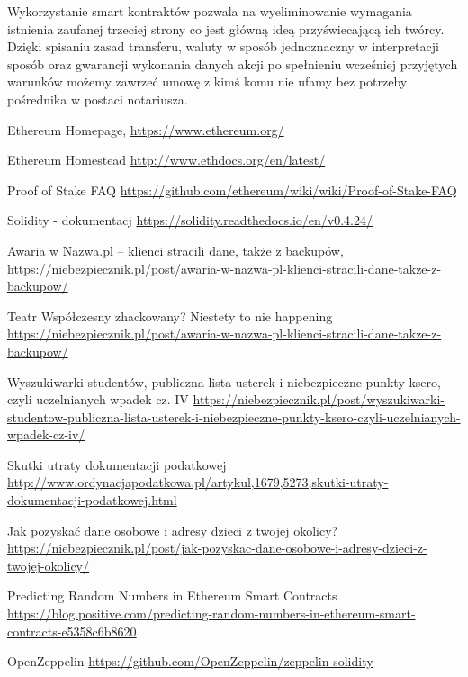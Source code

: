 \documentclass[]{llncs}
\begin{document}
  Wykorzystanie smart kontraktów pozwala na wyeliminowanie wymagania istnienia
  zaufanej trzeciej strony co jest główną ideą przyświecającą ich twórcy. Dzięki
  spisaniu zasad transferu, waluty w sposób jednoznaczny w interpretacji sposób
  oraz gwarancji wykonania danych akcji po spełnieniu wcześniej przyjętych
  warunków możemy zawrzeć umowę z kimś komu nie ufamy bez potrzeby pośrednika w
  postaci notariusza.

%
%
%
% 
% 
%
\begin{thebibliography}{splncs04}

   Ethereum Homepage,
  \url{https://www.ethereum.org/}

   Ethereum Homestead
  \url{http://www.ethdocs.org/en/latest/}

   Proof of Stake FAQ
  \url{https://github.com/ethereum/wiki/wiki/Proof-of-Stake-FAQ}

   Solidity - dokumentacj
  \url{https://solidity.readthedocs.io/en/v0.4.24/}

   Awaria w Nazwa.pl – klienci stracili dane,
  także z backupów,
  \url{https://niebezpiecznik.pl/post/awaria-w-nazwa-pl-klienci-stracili-dane-takze-z-backupow/}

   Teatr Współczesny zhackowany?
  Niestety to nie happening
  \url{https://niebezpiecznik.pl/post/awaria-w-nazwa-pl-klienci-stracili-dane-takze-z-backupow/}

   Wyszukiwarki studentów, publiczna lista
  usterek i niebezpieczne punkty ksero, czyli uczelnianych wpadek cz. IV
  \url{https://niebezpiecznik.pl/post/wyszukiwarki-studentow-publiczna-lista-usterek-i-niebezpieczne-punkty-ksero-czyli-uczelnianych-wpadek-cz-iv/}

   Skutki utraty dokumentacji podatkowej
  \url{http://www.ordynacjapodatkowa.pl/artykul,1679,5273,skutki-utraty-dokumentacji-podatkowej.html}

   Jak pozyskać dane osobowe i adresy dzieci z twojej
  okolicy?
  \url{https://niebezpiecznik.pl/post/jak-pozyskac-dane-osobowe-i-adresy-dzieci-z-twojej-okolicy/}

   Predicting Random Numbers in Ethereum Smart Contracts
  \url{https://blog.positive.com/predicting-random-numbers-in-ethereum-smart-contracts-e5358c6b8620}

   OpenZeppelin
  \url{https://github.com/OpenZeppelin/zeppelin-solidity}

\end{thebibliography}
\end{document}
